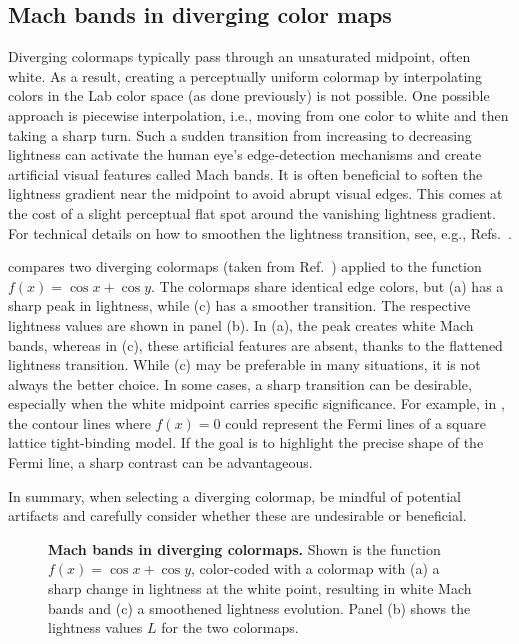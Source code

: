 \subsection{Mach bands in diverging color maps}

Diverging colormaps typically pass through an unsaturated midpoint, often white. As a result, creating a perceptually uniform colormap by interpolating colors in the Lab color space (as done previously) is not possible. One possible approach is piecewise interpolation, i.e., moving from one color to white and then taking a sharp turn.  Such a sudden transition from increasing to decreasing lightness can activate the human eye's edge-detection mechanisms and create artificial visual features called Mach bands. It is often beneficial to soften the lightness gradient near the midpoint to avoid abrupt visual edges. This comes at the cost of a slight perceptual flat spot around the vanishing lightness gradient. For technical details on how to smoothen the lightness transition, see, e.g., Refs.~\cite{moreland2009,kovesi2015}.

 compares two diverging colormaps (taken from Ref.~\cite{moreland2009}) applied to the function $f(x) = \cos x + \cos y$. The colormaps share identical edge colors, but (a) has a sharp peak in lightness, while (c) has a smoother transition. The respective lightness values are shown in panel (b). In (a), the peak creates white Mach bands, whereas in (c), these artificial features are absent, thanks to the flattened lightness transition.
While (c) may be preferable in many situations, it is not always the better choice. In some cases, a sharp transition can be desirable, especially when the white midpoint carries specific significance. For example, in , the contour lines where $f(x)=0$ could represent the Fermi lines of a square lattice tight-binding model. If the goal is to highlight the precise shape of the Fermi line, a sharp contrast can be advantageous.

In summary, when selecting a diverging colormap, be mindful of potential artifacts and carefully consider whether these are undesirable or beneficial.

\begin{figure}
	\centering
	
	\caption{\textbf{Mach bands in diverging colormaps.} Shown is the function $f(x) = \cos x + \cos y$, color-coded with a colormap with (a) a sharp change in lightness at the white point, resulting in white Mach bands and (c) a smoothened lightness evolution. Panel (b) shows the lightness values $L$ for the two colormaps.}
	\label{fig:machbands}
\end{figure}


